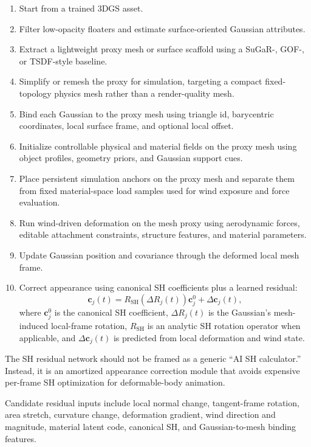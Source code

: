 \documentclass[11pt]{article}
\begin{document}
\begin{enumerate}
  \item Start from a trained 3DGS asset.
  \item Filter low-opacity floaters and estimate surface-oriented Gaussian attributes.
  \item Extract a lightweight proxy mesh or surface scaffold using a SuGaR-, GOF-, or TSDF-style baseline.
  \item Simplify or remesh the proxy for simulation, targeting a compact fixed-topology physics mesh rather than a render-quality mesh.
  \item Bind each Gaussian to the proxy mesh using triangle id, barycentric coordinates, local surface frame, and optional local offset.
  \item Initialize controllable physical and material fields on the proxy mesh using object profiles, geometry priors, and Gaussian support cues.
  \item Place persistent simulation anchors on the proxy mesh and separate them from fixed material-space load samples used for wind exposure and force evaluation.
  \item Run wind-driven deformation on the mesh proxy using aerodynamic forces, editable attachment constraints, structure features, and material parameters.
  \item Update Gaussian position and covariance through the deformed local mesh frame.
  \item Correct appearance using canonical SH coefficients plus a learned residual:
  \[
    \mathbf{c}_j(t) = R_{\mathrm{SH}}(\Delta R_j(t)) \mathbf{c}_j^0 + \Delta \mathbf{c}_j(t),
  \]
  where \(\mathbf{c}_j^0\) is the canonical SH coefficient, \(\Delta R_j(t)\) is the Gaussian's mesh-induced local-frame rotation, \(R_{\mathrm{SH}}\) is an analytic SH rotation operator when applicable, and \(\Delta \mathbf{c}_j(t)\) is predicted from local deformation and wind state.
\end{enumerate}

The SH residual network should not be framed as a generic ``AI SH calculator.'' Instead, it is an amortized appearance correction module that avoids expensive per-frame SH optimization for deformable-body animation.

Candidate residual inputs include local normal change, tangent-frame rotation, area stretch, curvature change, deformation gradient, wind direction and magnitude, material latent code, canonical SH, and Gaussian-to-mesh binding features.
\end{document}
